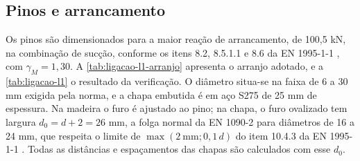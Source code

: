 \subsection{Pinos e arrancamento}\label{ssec:pinos-l1}

Os pinos são dimensionados para a maior reação de arrancamento, de 100,5 kN, na
combinação de sucção, conforme os itens 8.2, 8.5.1.1 e 8.6 da
EN 1995-1-1 \cite{EN1995-1-1:2004}, com $\gamma_M = 1{,}30$. A
\autoref{tab:ligacao-l1-arranjo} apresenta o arranjo adotado, e a
\autoref{tab:ligacao-l1} o resultado da verificação. O diâmetro situa-se na faixa de
6 a 30 mm exigida pela norma, e a chapa embutida é em aço S275 de 25 mm de
espessura. Na madeira o furo é ajustado ao pino; na chapa, o furo ovalizado tem
largura $d_0 = d + 2 = 26$ mm, a folga normal da EN 1090-2 \cite{EN1090-2:2018}
para diâmetros de 16 a 24 mm, que respeita o limite de $\max(2\ \text{mm};
0{,}1\,d)$ do item 10.4.3 da EN 1995-1-1 \cite{EN1995-1-1:2004}. Todas as
distâncias e espaçamentos das chapas são calculados com esse $d_0$.


